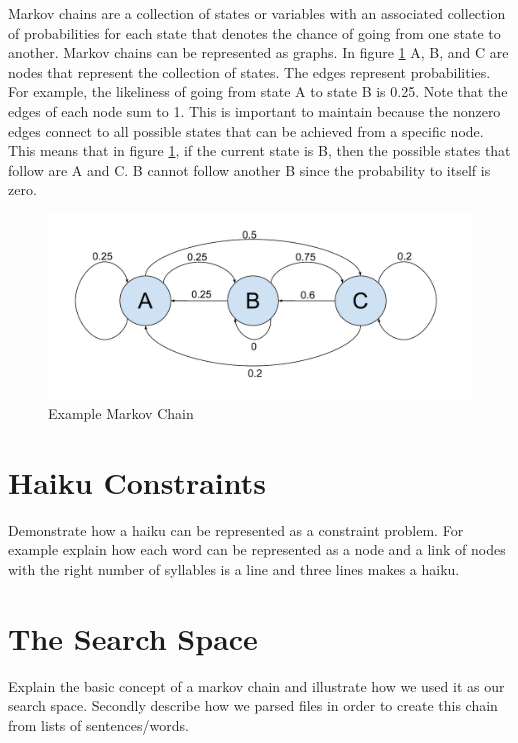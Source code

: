 \documentclass[]{article}
\begin{document}
Markov chains are a collection of states or variables with an associated collection of probabilities for each state that denotes the chance of going from one state to another. Markov chains can be represented as graphs. In figure \ref{fig:Chain} A, B, and C are nodes that represent the collection of states. The edges represent probabilities. For example, the likeliness of going from state A to state B is 0.25. Note that the edges of each node sum to 1. This is important to maintain because the nonzero edges connect to all possible states that can be achieved from a specific node. This means that in figure \ref{fig:Chain}, if the current state is B, then the possible states that follow are A and C. B cannot follow another B since the probability to itself is zero. \cite{Markov}

\begin{figure}[H]
	\centering
	\includegraphics[width=1\textwidth]{MarkovChainExample}
	\caption{Example Markov Chain}
	\label{fig:Chain}
\end{figure}

\section{Haiku Constraints}
Demonstrate how a haiku can be represented as a constraint problem. For example explain how each word can be represented as a node and a link of nodes with the right number of syllables is a line and three lines makes a haiku.

\section{The Search Space}
Explain the basic concept of a markov chain and illustrate how we used it as our search space. Secondly describe how we parsed files in order to create this chain from lists of sentences/words.
\end{document}
